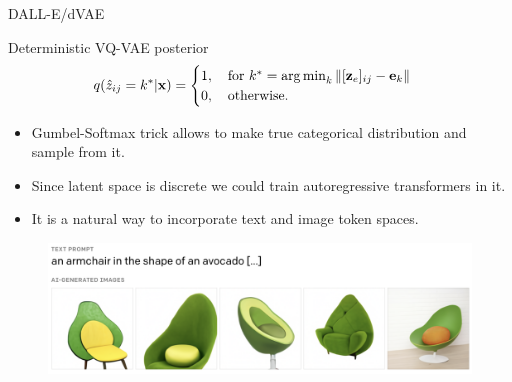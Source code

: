 \begin{frame}{DALL-E/dVAE}
	\begin{block}{Deterministic VQ-VAE posterior}
		\vspace{-0.3cm}
		\[
			q(\hat{z}_{ij} = k^* | \mathbf{x}) = \begin{cases}
				1 , \quad \text{for } k^* = \operatorname*{arg\,min}_k \| [\mathbf{z}_e]_{ij} - \mathbf{e}_k \| \\
				0, \quad \text{otherwise}.
			\end{cases}
		\]
		\vspace{-0.3cm}
	\end{block}
	\begin{itemize}
		\item Gumbel-Softmax trick allows to make true categorical distribution and sample from it.
		\item Since latent space is discrete we could train autoregressive transformers in it.
		\item It is a natural way to incorporate text and image token spaces.
	\end{itemize}
	\begin{figure}
		\includegraphics[width=\linewidth]{figs/dalle}
	\end{figure}
\end{frame}
